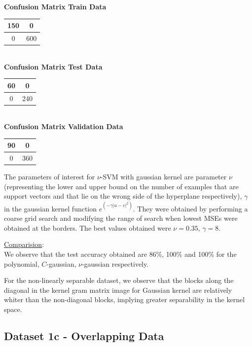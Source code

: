 \documentclass{article}
\begin{document}
\begin{flushleft}
\textbf{Confusion Matrix Train Data\\[5pt]}
\begin{tabular}{|c|c|}
\hline
150 & 0 \\
\hline
0 & 600\\
\hline
\end{tabular}
\textbf{\\[10pt] Confusion Matrix Test Data \\[5pt]}
\begin{tabular}{|c|c|}
\hline
60 & 0 \\
\hline
0 & 240\\
\hline
\end{tabular}
\textbf{\\[10pt] Confusion Matrix Validation Data \\[5pt]}
\begin{tabular}{|c|c|}
\hline
90 & 0 \\
\hline
0 & 360\\
\hline
\end{tabular}
\end{flushleft}



The parameters of interest for $\nu$-SVM with gaussian kernel are parameter $\nu$(representing the lower and upper bound on the number of examples that are support vectors and that lie on the wrong side of the hyperplane respectively), $\gamma$ in the gaussian kernel function $e^{(-\gamma|u-v|^{2})}$. They were obtained by performing a coarse grid search and modifying the range of search when lowest MSEs were obtained at the borders.
The best values obtained were $\nu=0.35$, $\gamma=8$.

\underline{Comparision}:\\
We observe that the test accuracy obtained are 86\%, 100\% and 100\% for the polynomial, $C$-gaussian, $\nu$-gaussian respectively.

For the non-linearly separable dataset, we observe that the blocks along the diagonal in the kernel gram matrix image for Gaussian kernel are relatively whiter than the non-diagonal blocks, implying greater separability in the kernel space.


\subsection{Dataset 1c - Overlapping Data}
\end{document}

